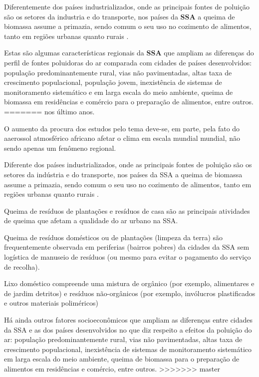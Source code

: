 Diferentemente dos países industrializados, onde as principais fontes de poluição 
são os setores da industria e do transporte, nos países da \textbf{SSA} a 
queima de biomassa assume a primazia, sendo comum o seu uso no cozimento 
de alimentos, tanto em regiões urbanas quanto rurais \citep{SMITH2004}. 

Estas são algumas características regionais da \textbf{SSA} que ampliam as 
diferenças do perfil de fontes poluidoras do ar comparada com cidades 
de países desenvolvidos: população predominantemente rural,
vias não pavimentadas, altas taxa de crescimento populacional, população jovem,
inexistência de sistemas de monitoramento sistemático e em larga escala do meio 
ambiente, queima de biomassa em residências e comércio para o preparação
de alimentos, entre outros. 
=======
nos último anos.
 
O aumento da procura dos estudos pelo tema deve-se, em parte, 
pela fato do aaerossol atmosférico africano afetar o clima 
em escala mundial mundial, não sendo apenas um fenômeno regional.

Diferente dos países industrializados, onde as principais fontes de poluição 
são os setores da indústria e do transporte, nos países da SSA a 
queima de biomassa assume a primazia, sendo comum o seu uso no cozimento 
de alimentos, tanto em regiões urbanas quanto rurais \citep{SMITH2004}. 

Queima de resíduos de plantações e resíduos de casa são as principais 
atividades de queima que afetam a qualidade do ar urbano  na SSA.

Queima de resíduos domésticos ou de plantações (limpeza da terra) são frequentemente observada 
em periferias (bairros pobres) da cidades da SSA sem logística de manuseio de 
resíduos (ou mesmo para evitar o pagamento do serviço de recolha).

Lixo doméstico compreende uma mistura de orgânico 
(por exemplo, alimentares e de jardim detritos)
e resíduos não-orgânicos (por exemplo, invólucros plastificados e
outros materiais poliméricos) 

Há ainda outros fatores socioeconômicos que ampliam as diferenças entre
cidades da SSA e as dos países desenvolvidos no que diz respeito
a efeitos da poluição do ar: população predominantemente rural,
vias não pavimentadas, altas taxa de crescimento populacional,
inexistência de sistemas de monitoramento sistemático em larga escala do meio 
ambiente, queima de biomassa para o preparação de alimentos em 
residências e comércio, entre outros. 
>>>>>>> master

